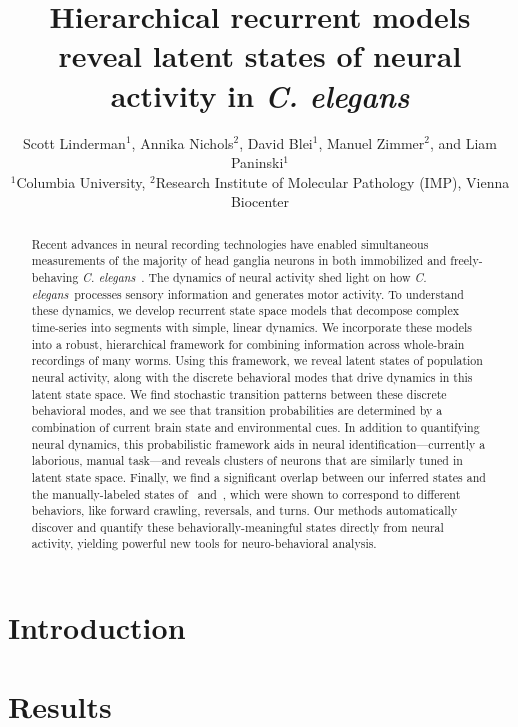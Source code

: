 \documentclass[11pt]{article}
\title{Hierarchical recurrent models reveal latent states of neural activity in \textit{C. elegans}}
\author{Scott Linderman$^{\text{1}}$,
  Annika Nichols$^{\text{2}}$,
  David Blei$^{\text{1}}$,
  Manuel Zimmer$^{\text{2}}$,
  and
  Liam Paninski$^{\text{1}}$
  \\
  $^{\text{1}}$Columbia University,
  $^{\text{2}}$Research Institute of Molecular Pathology (IMP), Vienna Biocenter
}
\newcommand{\celegans}{\textit{C. elegans}}
\begin{document}
\doublespacing

\maketitle

\begin{abstract}
  Recent advances in neural recording technologies have enabled
  simultaneous measurements of the majority of head ganglia neurons in
  both immobilized and freely-behaving
  \celegans~\citep{schrodel2013brain, prevedel2014simultaneous,
    nguyen2016whole}.  The dynamics of neural activity shed light on
  how \celegans~processes sensory information and generates motor
  activity.  To understand these dynamics, we develop recurrent state
  space models that decompose complex time-series into segments with
  simple, linear dynamics. We incorporate these models into a robust,
  hierarchical framework for combining information across whole-brain
  recordings of many worms.  Using this framework, we reveal latent
  states of population neural activity, along with the discrete
  behavioral modes that drive dynamics in this latent state space.  We
  find stochastic transition patterns between these discrete
  behavioral modes, and we see that transition probabilities are
  determined by a combination of current brain state and environmental
  cues.  In addition to quantifying neural dynamics, this
  probabilistic framework aids in neural identification---currently a
  laborious, manual task---and reveals clusters of neurons that are
  similarly tuned in latent state space.  Finally, we find a
  significant overlap between our inferred states and the
  manually-labeled states of~\citet{kato2015global}
  and~\citet{nichols2017global}, which were shown to correspond to
  different behaviors, like forward crawling, reversals, and
  turns. Our methods automatically discover and quantify these
  behaviorally-meaningful states directly from neural activity,
  yielding powerful new tools for neuro-behavioral analysis.
\end{abstract}

\clearpage

\section*{Introduction}

\clearpage

\section*{Results}
\end{document}
